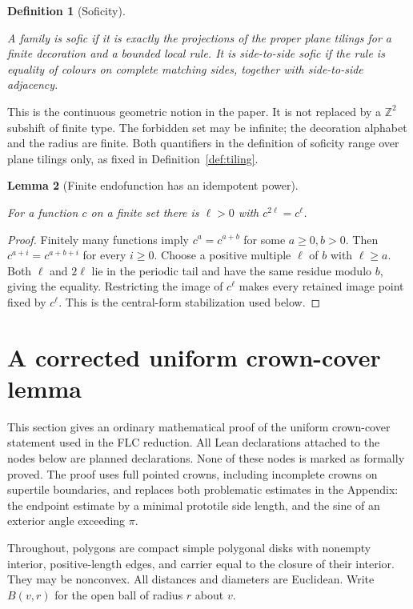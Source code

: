 \documentclass[11pt,a4paper]{article}
\newtheorem{definition}{Definition}[section]
\newtheorem{lemma}[definition]{Lemma}
\theoremstyle{remark}
\newcommand{\lean}[1]{}
\newcommand{\uses}[1]{}
\begin{document}
\begin{definition}[Soficity]\label{def:sofic}
\lean{Tilings.IsSofic,Tilings.IsSideToSideSofic}
\uses{def:localrule}
A family is sofic if it is exactly the projections of the proper plane
tilings for a finite decoration and a bounded local rule.
It is side-to-side sofic if the rule is equality of colours on complete
matching sides, together with side-to-side adjacency.
\end{definition}

This is the continuous geometric notion in the paper. It is not replaced
by a $\mathbb Z^2$ subshift of finite type. The forbidden set may be infinite;
the decoration alphabet and the radius are finite. Both quantifiers in the
definition of soficity range over plane tilings only, as fixed in
Definition~\ref{def:tiling}.

\begin{lemma}[Finite endofunction has an idempotent power]
\label{lem:finite-idempotent}
\lean{Tilings.FiniteMap.exists_idempotent_iterate}
For a function $c$ on a finite set there is $\ell>0$ with $c^{2\ell}=c^\ell$.
\end{lemma}
\begin{proof}
Finitely many functions imply $c^a=c^{a+b}$ for some $a\geq0,b>0$.
Then $c^{a+i}=c^{a+b+i}$ for every $i\geq0$. Choose a positive multiple
$\ell$ of $b$ with $\ell\geq a$. Both $\ell$ and $2\ell$ lie in the periodic
tail and have the same residue modulo $b$, giving the equality.
Restricting the image of $c^\ell$ makes every retained image point fixed
by $c^\ell$. This is the central-form stabilization used below.
\end{proof}

\section{A corrected uniform crown-cover lemma}
\label{sec:corrected-crowns}

This section gives an ordinary mathematical proof of the uniform
crown-cover statement used in the FLC reduction.  All Lean declarations
attached to the nodes below are planned declarations.  None of these nodes
is marked as formally proved.  The proof uses full pointed crowns, including
incomplete crowns on supertile boundaries, and replaces both problematic
estimates in the Appendix: the endpoint estimate by a minimal prototile side
length, and the sine of an exterior angle exceeding $\pi$.

Throughout, polygons are compact simple polygonal disks with nonempty
interior, positive-length edges, and carrier equal to the closure of their
interior.  They may be nonconvex.  All distances and diameters are Euclidean.
Write $B(v,r)$ for the open ball of radius $r$ about $v$.
\end{document}
